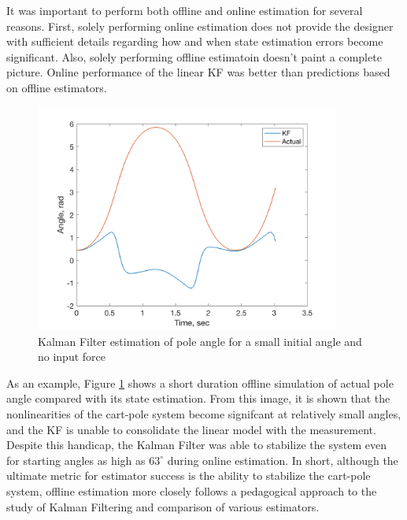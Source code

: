 \documentclass{article}
\begin{document}
It was important to perform both offline and online estimation for several reasons. First, solely performing online estimation does not provide the designer with sufficient details regarding how and when state estimation errors become significant. Also, solely performing offline estimatoin doesn't paint a complete picture. Online performance of the linear KF was better than predictions based on offline estimators. \\
\begin{figure}[h!]
	\centering
	\includegraphics[width=10cm,keepaspectratio]{NoForcingOpen.png}
	\caption{Kalman Filter estimation of pole angle for a small initial angle and no input force}
	\label{fig:NoForcing}
\end{figure}

As an example, Figure \ref{fig:NoForcing} shows a short duration offline simulation of actual pole angle compared with its state estimation. From this image, it is shown that the nonlinearities of the cart-pole system become signifcant at relatively small angles, and the KF is unable to consolidate the linear model with the measurement. Despite this handicap, the Kalman Filter was able to stabilize the system even for starting angles as high as $63^\circ{}$ during online estimation. In short, although the ultimate metric for estimator success is the ability to stabilize the cart-pole system, offline estimation more closely follows a pedagogical approach to the study of Kalman Filtering and comparison of various estimators.
\end{document}
